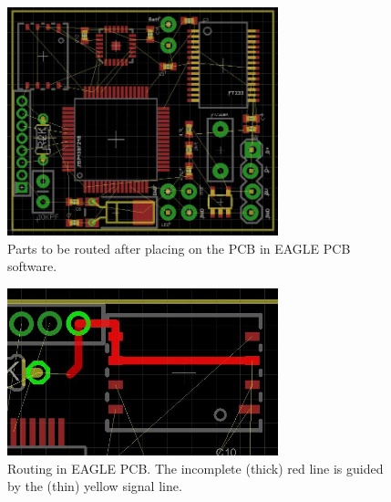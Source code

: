 \begin{figure}
\begin{center}
\includegraphics[width=0.7\textwidth]{images/Layout2.jpg}
\caption{Parts to be routed after placing on the PCB in EAGLE PCB software.}
\label{Fig:Layout2}
\end{center}
\end{figure}
\begin{figure}
\begin{center}
\includegraphics[width=0.7\textwidth]{images/Layout3.jpg}
\caption{Routing in EAGLE PCB. The incomplete (thick) red line is guided by the (thin) yellow signal line.}
\label{Fig:Layout3}
\end{center}
\end{figure}
